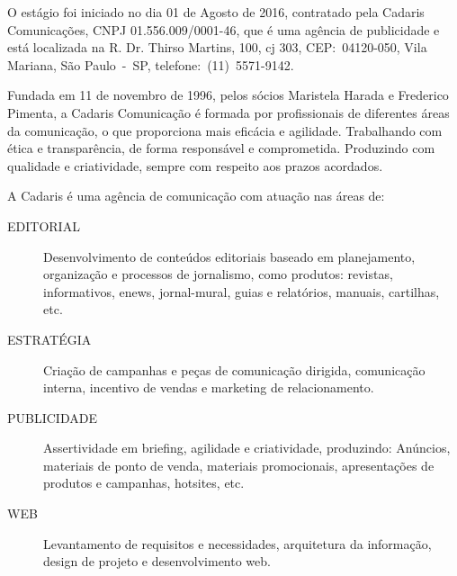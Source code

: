 \documentclass[
  12pt,				%
  openany,
  oneside,
  a4paper,			%
  english,			%
  brazil
]{article}
\numberwithin{figure}{section}
\numberwithin{table}{section}
\begin{document}


O estágio foi iniciado no dia 01 de Agosto de 2016, contratado pela Cadaris Comunicações, CNPJ 01.556.009/0001-46, que é uma agência de publicidade e está localizada na R. Dr. Thirso Martins, 100, cj 303, CEP:~04120-050, Vila Mariana, São Paulo~-~SP, telefone:~(11)~5571-9142.

Fundada em 11 de novembro de 1996, pelos sócios Maristela Harada e Frederico Pimenta, a Cadaris Comunicação é formada por profissionais de diferentes áreas da comunicação, o que proporciona mais eficácia e agilidade. Trabalhando com ética e transparência, de forma responsável e comprometida. Produzindo com qualidade e criatividade, sempre com respeito aos prazos acordados.

A Cadaris é uma agência de comunicação com atuação nas áreas de:
\vspace{-0.5cm}

\begin{description}
   \item [EDITORIAL] Desenvolvimento de conteúdos editoriais baseado em planejamento, organização e processos de jornalismo, como produtos: revistas, informativos, enews, jornal-mural, guias e relatórios, manuais, cartilhas, etc.
   \item [ESTRATÉGIA] Criação de campanhas e peças de comunicação dirigida, comunicação interna, incentivo de vendas e marketing de relacionamento.
   \item [PUBLICIDADE]  Assertividade em briefing, agilidade e criatividade, produzindo: Anúncios, materiais de ponto de venda, materiais promocionais, apresentações de produtos e campanhas, hotsites, etc.
   \item [WEB] Levantamento de requisitos e necessidades, arquitetura da informação, design de projeto e desenvolvimento web.
\end{description}
\end{document}

